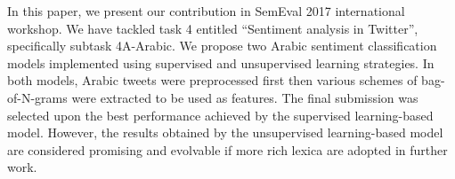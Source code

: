 In this paper, we present our contribution in SemEval 2017 international workshop. We have tackled task 4 entitled ``Sentiment analysis in Twitter'', specifically subtask 4A-Arabic. We propose two Arabic sentiment classification models implemented using supervised and unsupervised learning strategies. In both models, Arabic tweets were preprocessed first then various schemes of bag-of-N-grams were extracted to be used as features. The final submission was selected upon the best performance achieved by the supervised learning-based model. However, the results obtained by the unsupervised learning-based model are considered promising and evolvable if more rich lexica are adopted in further work.
